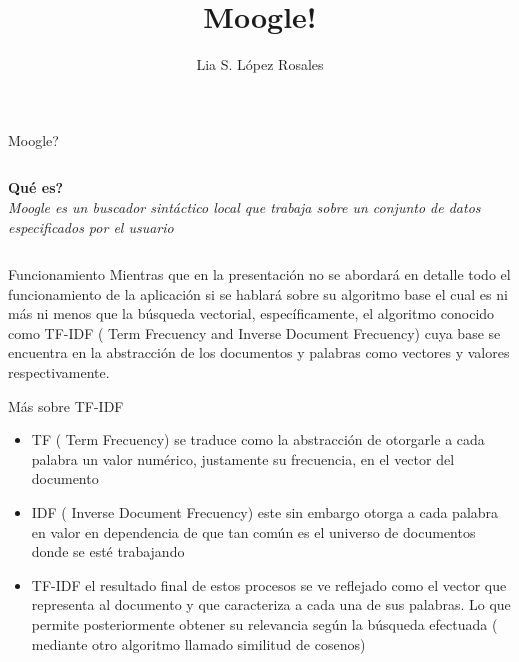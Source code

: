 \documentclass[options]{beamer}
\title{Moogle!}
\author{Lia S. López Rosales}
\begin{document}
\frame{\titlepage}
\begin{frame}{Moogle?}
    \begin{columns}[t]
        \begin{column}{.5\textwidth}
            \begin{center}
                \textbf{\Large Qué es?}\\
                \emph{Moogle es un buscador sintáctico local que trabaja sobre un conjunto de datos especificados por el usuario}
            \end{center}
        \end{column}
    \end{columns}
    
\end{frame}

\begin{frame}{Funcionamiento}
    \Large Mientras que en la presentación no se abordará en detalle todo el funcionamiento de la aplicación si se hablará sobre su algoritmo base el cual es ni más ni menos que la búsqueda vectorial, específicamente, el algoritmo conocido como TF-IDF ( Term Frecuency and Inverse Document Frecuency) cuya base se encuentra en la abstracción de los documentos y palabras como vectores y valores respectivamente. 
\end{frame}

\begin{frame}{Más sobre TF-IDF}
    \begin{itemize}
        \item TF ( Term Frecuency) se traduce como la abstracción de otorgarle a cada palabra un valor numérico, justamente su frecuencia, en el vector del documento 
        \item IDF ( Inverse Document Frecuency) este sin embargo otorga a cada palabra en valor en dependencia de que tan común es el universo de documentos donde se esté trabajando
        \item TF-IDF el resultado final de estos procesos se ve reflejado como el vector que representa al documento y que caracteriza a cada una de sus palabras. Lo que permite posteriormente obtener su relevancia según la búsqueda efectuada ( mediante otro algoritmo llamado similitud de cosenos)
    \end{itemize}
\end{frame}
\end{document}
